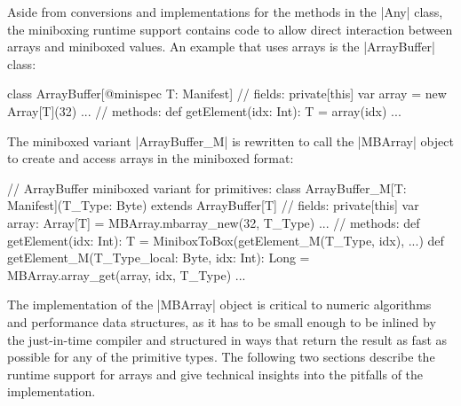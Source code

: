 Aside from conversions and implementations for the methods in the |Any| class, the miniboxing runtime support contains code to allow direct interaction between arrays and miniboxed values. An example that uses arrays is the |ArrayBuffer| class:

\begin{lstlisting-nobreak}
 class ArrayBuffer[@minispec T: Manifest] {
   // fields: 
   private[this] var array = new Array[T](32) 
   ...
   // methods: 
   def getElement(idx: Int): T = array(idx)
   ...
 }
\end{lstlisting-nobreak}

The miniboxed variant |ArrayBuffer_M| is rewritten to call the |MBArray| object to create and access arrays in the miniboxed format: 
  
\begin{lstlisting-nobreak}
 // ArrayBuffer miniboxed variant for primitives:
 class ArrayBuffer_M[T: Manifest](T_Type: Byte) 
                               extends ArrayBuffer[T] {
   // fields:
   private[this] var array: Array[T] = MBArray.mbarray_new(32, T_Type)
   ...
   // methods: 
   def getElement(idx: Int): T = 
       MiniboxToBox(getElement_M(T_Type, idx), ...)
   def getElement_M(T_Type_local: Byte, idx: Int): Long = 
       MBArray.array_get(array, idx, T_Type)
   ...
 }
\end{lstlisting-nobreak}

The implementation of the |MBArray| object is critical to numeric algorithms and performance data structures, as it has to be small enough to be inlined by the just-in-time compiler and structured in ways that return the result as fast as possible for any of the primitive types. The following two sections describe the runtime support for arrays and give technical insights into the pitfalls of the implementation.